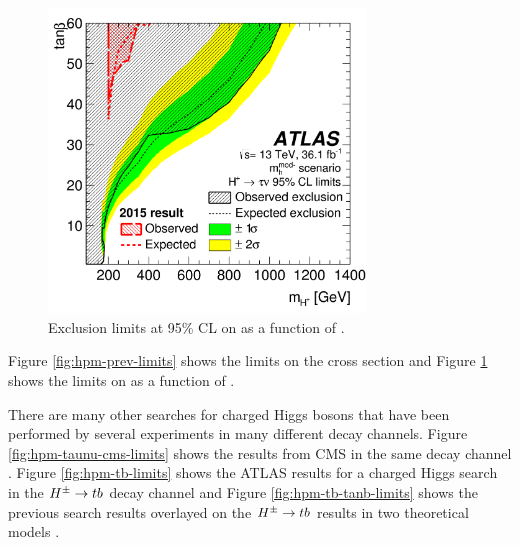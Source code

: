 		\begin{figure}[!ht]
			\centering
			\includegraphics[width=0.75\textwidth]{chapters/chapter2_theory/images/Previous_Limits_Combined_tanb.png}
			\caption{\label{fig:hpm-prev-limits-tanb} Exclusion limits at 95\% CL on \tanb as a function of \mHpm \cite{hpm-previous}. }
		\end{figure}
		Figure \ref{fig:hpm-prev-limits} shows the limits on the cross section and Figure \ref{fig:hpm-prev-limits-tanb} shows the limits on \tanb as a function of \mHpm. 

		There are many other searches for charged Higgs bosons that have been performed by several experiments in many different decay channels. Figure \ref{fig:hpm-taunu-cms-limits} shows the results from CMS in the same \HpmLong decay channel \cite{CMS-taunu}. Figure \ref{fig:hpm-tb-limits} shows the ATLAS results for a charged Higgs search in the $H^{\pm} \to tb$ decay channel and Figure \ref{fig:hpm-tb-tanb-limits} shows the previous \HpmLong search results overlayed on the $H^{\pm} \to tb$ results in two theoretical models \cite{Hpm-to-tb}.


